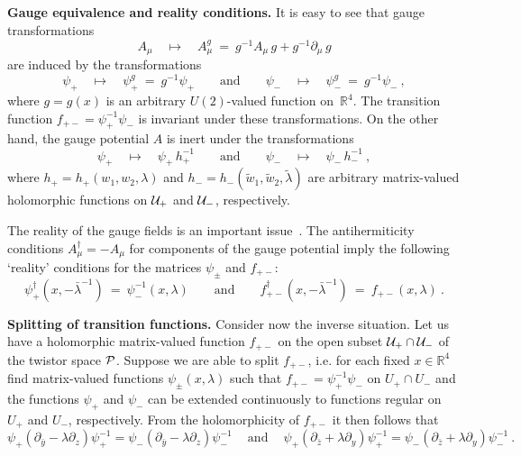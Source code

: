 \documentclass[a4paper,11pt]{article}
\numberwithin{equation}{section}
\def\l{\lambda}
\newcommand{\R}{\mathbb R}
\newcommand{\Pcal}{{\cal P}}
\newcommand{\U}{{\cal U}}
\def\pa{\mbox{$\partial$}}
\def\+{\dagger}
\begin{document}
\noindent
{\bf Gauge equivalence and reality conditions.} 
It is easy to see that gauge transformations
\begin{equation}
A_\mu\quad \mapsto\quad A_\mu^g\ =\ g^{-1}A_\mu\, g +g^{-1}\pa_\mu\, g
\end{equation}
are induced by the transformations
\begin{equation}
\psi_+\quad \mapsto\quad \psi_+^g\ =\ g^{-1}\psi_+\qquad\textrm{and}\qquad
\psi_-\quad \mapsto\quad \psi_-^g\ =\ g^{-1}\psi_-\ ,
\end{equation}
where $g{=}g(x)$ is an arbitrary $U(2)$-valued function on~$\R^4$.
The transition function $f_{+-}=\psi_+^{-1}\psi_-$ is invariant 
under these transformations. On the other hand, 
the gauge potential $A$ is inert under the transformations
\begin{equation} \label{inert}
\psi_+\quad\mapsto\quad\psi_+\,h_+^{-1}\qquad\textrm{and}\qquad
\psi_-\quad\mapsto\quad\psi_-\,h_-^{-1}\ ,
\end{equation}
where $h_+{=}h_+(w_1,w_2,\l)$ and 
$h_-{=}h_-(\tilde w_1,\tilde w_2,\tilde \l)$ 
are arbitrary matrix-valued 
holomorphic functions on $\U_+$ and $\U_-$, respectively.

The reality of the gauge fields is 
an important issue~\cite{Atiyah:1977pw,Atiyah:1978wi}.
The antihermiticity conditions 
$A_\mu^\+ = -A_\mu$ for components of the gauge potential imply
the following `reality' conditions for the matrices $\psi_{\pm}$ and $f_{+-}$:
\begin{equation}\label{real} 
\psi_+^\+(x, - {\bar\l}^{-1})\ =\ \psi_-^{-1}(x,\l) \qquad\textrm{and}\qquad
f_{+-}^\+ (x, -{\bar\l}^{-1})\ =\ f_{+-} (x,\l)\ .
\end{equation}

\noindent
{\bf Splitting of transition functions.} 
Consider now the inverse 
situation. Let us have a holomorphic matrix-valued function $f_{+-}$ 
on the open subset $\U_+\cap\U_-$ of the twistor space $\Pcal$. 
Suppose we are able to split $f_{+-}$, i.e. for each fixed 
$x\in\R^4$ find matrix-valued functions $\psi_{\pm}(x,\l )$ such 
that $f_{+-}=\psi_+^{-1}\psi_-$ on $U_+\cap U_-$ and the functions $\psi_+$ and 
$\psi_-$ can be extended continuously to functions regular on $U_+$ and 
$U_-$, respectively. From the holomorphicity of $f_{+-}$ it then follows 
that
\begin{equation}\label{hol}
\psi_{+}(\pa_{\bar y}-\l\pa_z)\psi_{+}^{-1} =
\psi_{-} (\pa_{\bar y}-\l\pa_z)\psi_-^{-1} \quad\ \textrm{and}\quad\
\psi_{+}(\pa_{\bar z}+\l\pa_y)\psi_{+}^{-1} =
\psi_{-} (\pa_{\bar z}+\l\pa_y)\psi_-^{-1}\ .
\end{equation}
\end{document}
